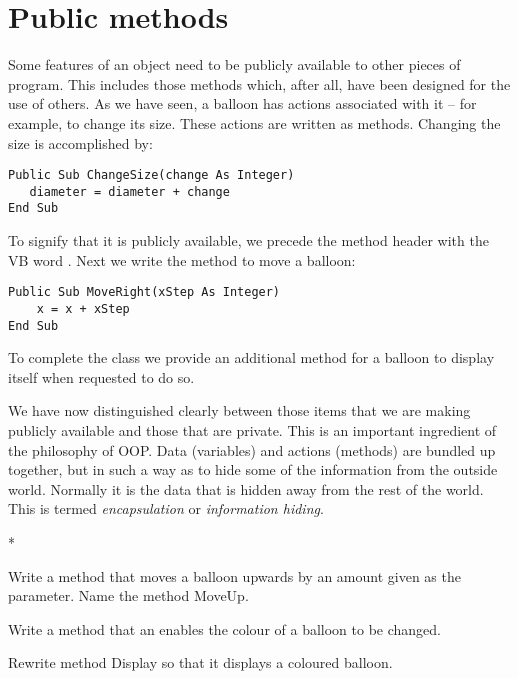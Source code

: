 	\section{Public methods}
		Some features of an object need to be publicly available to other pieces of program. This includes those methods which, after all, have been designed for the use of others. As we have seen, a balloon has actions associated with it – for example, to change its size. These actions are written as methods. Changing the size is accomplished by:
		\begin{lstlisting}
Public Sub ChangeSize(change As Integer)
   diameter = diameter + change
End Sub
		\end{lstlisting}
		To signify that it is publicly available, we precede the method header with the VB word . Next we write the method to move a balloon:
		\begin{lstlisting}
Public Sub MoveRight(xStep As Integer)
	x = x + xStep
End Sub
		\end{lstlisting}
		To complete the class we provide an additional method for a balloon to display itself when requested to do so.
		
		We have now distinguished clearly between those items that we are making publicly available and those that are private. This is an important ingredient of the philosophy of OOP. Data (variables) and actions (methods) are bundled up together, but in such a way as to hide some of the information from the outside world. Normally it is the data that is hidden away from the rest of the world. This is termed \emph{encapsulation} or \emph{information hiding}.

		\begin{stqb}*
			\begin{STQ}
				\item Write a method that moves a balloon upwards by an amount given as the parameter. Name the method MoveUp.
				\item Write a method that an enables the colour of a balloon to be changed.
				\item Rewrite method Display so that it displays a coloured balloon.
			\end{STQ}
		\end{stqb}


